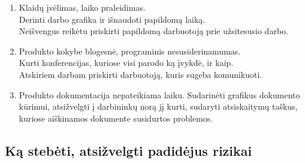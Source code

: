 \documentclass[a4paper,12pt]{article}
\begin{document}
\begin{enumerate}
	\item Klaid\k u \k iv\. elimas, laiko praleidimas.\\
  		Derinti darbo grafika ir i\v snaudoti papildom\k a laik\k a. \\
  		Neišvengus reik\. etu priskirti papildom\k a darbuotoj\k a prie u\v zsitesusio darbo.
  		
  		
	\item Produkto kokybe blogesn\. e,	programinis nesusiderinamumas. \\ 
  		Kurti konferencijas, kuriose visi parodo k\k a \k ivykd\. e,  ir kaip. \\
  		Atskiriem darbam priskirti darbuotoj\k a, kuris sugeba komunikuoti.
  
	\item Produkto dokumentacija nepateikiama laiku.
  		Sudarin\. eti grafikus dokumento k\= urimui, atsi\v zvelgti \k i darbinink\k u nor\k a
  		j\k i kurti, sudaryti atsiskaitym\k u ta\v skus, kuriose ai\v skinamos dokumente 
  		susidurtos problemos.
  		
\end{enumerate}

\clearpage

\subsection{K\k a steb\. eti, atsi\v zvelgti padid\. ejus rizikai}
\end{document}
